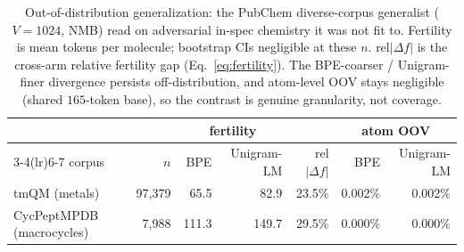 \begin{table}[htbp]
  \centering
  \caption{Out-of-distribution generalization: the PubChem diverse-corpus generalist ($V{=}1024$, NMB) read on adversarial in-spec chemistry it was not fit to. Fertility is mean tokens per molecule; bootstrap CIs negligible at these $n$. rel$|\Delta f|$ is the cross-arm relative fertility gap (Eq.~\ref{eq:fertility}). The BPE-coarser / Unigram-finer divergence persists off-distribution, and atom-level OOV stays negligible (shared $165$-token base), so the contrast is genuine granularity, not coverage.}
  \label{tab:ood-eval}
  \small
  \begin{tabular}{@{}l r rr r rr@{}}
    \toprule
    & & \multicolumn{2}{c}{fertility} & & \multicolumn{2}{c}{atom OOV}\\
    \cmidrule(lr){3-4}\cmidrule(lr){6-7}
    corpus & $n$ & BPE & Unigram-LM & rel$|\Delta f|$ & BPE & Unigram-LM \\
    \midrule
    tmQM (metals) & 97,379 & 65.5 & 82.9 & 23.5\% & 0.002\% & 0.002\% \\
    CycPeptMPDB (macrocycles) & 7,988 & 111.3 & 149.7 & 29.5\% & 0.000\% & 0.000\% \\
    \bottomrule
  \end{tabular}
\end{table}
